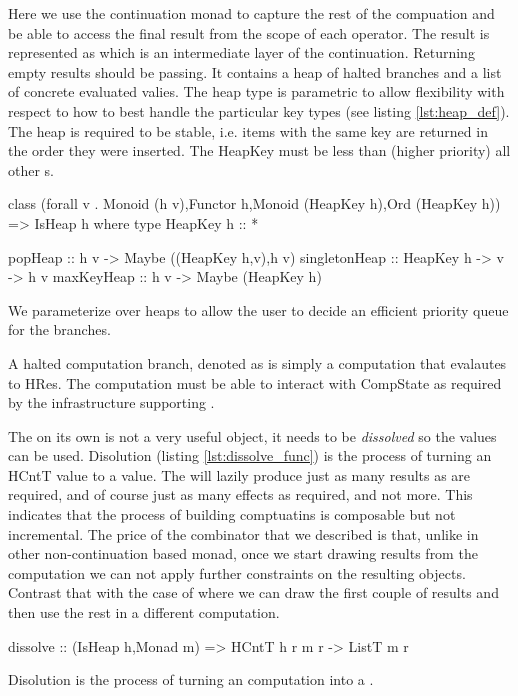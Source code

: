 Here we use the continuation monad to capture the rest of the
compuation and be able to access the final result from the scope of
each operator. The result is represented as  which is an
intermediate layer of the continuation. Returning empty results should
be passing. It contains a heap of halted branches and a list of
concrete evaluated valies. The heap type is parametric to allow
flexibility with respect to how to best handle the particular key
types (see listing \ref{lst:heap_def}). The heap is required to be stable,
i.e. items with the same key are returned in the order they were
inserted. The HeapKey  must be less than (higher priority) all
other  s.

\begin{code}
\begin{haskellcode}
class (forall v . Monoid (h v),Functor h,Monoid (HeapKey h),Ord (HeapKey h))
  => IsHeap h where
  type HeapKey h :: *

  popHeap :: h v -> Maybe ((HeapKey h,v),h v)
  singletonHeap :: HeapKey h -> v -> h v
  maxKeyHeap :: h v -> Maybe (HeapKey h)
\end{haskellcode}

  \caption{\label{lst:heap_def} We parameterize over heaps to allow
    the user to decide an efficient priority queue for the branches.}
\end{code}

A halted computation branch, denoted as  is simply a
computation that evalautes to HRes. The computation must be able to
interact with CompState as required by the infrastructure supporting
\hask{<//>}.

The  on its own is not a very useful object, it needs to
be \emph{dissolved} so the values can be used. Disolution (listing
\ref{lst:dissolve_func}) is the process of turning an HCntT value to a
 value. The  will lazily produce just as many
results as are required, and of course just as many effects as
required, and not more. This indicates that the process of building
comptuatins is composable but not incremental. The price of the
\hask{<//>} combinator that we described is that, unlike in other
non-continuation based monad, once we start drawing results from the
computation we can not apply further constraints on the resulting
objects. Contrast that with the case of  where we can draw
the first couple of results and then use the rest in a different
computation.

\begin{code}
\begin{haskellcode}
dissolve :: (IsHeap h,Monad m) => HCntT h r m r -> ListT m r
\end{haskellcode}
  \caption{\label{lst:dissolve_func}Disolution is the process of
    turning an  computation into a .}
\end{code}

